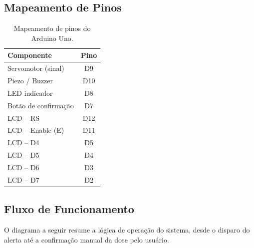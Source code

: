 \documentclass[11pt,a4paper]{article}
\begin{document}
\subsection{Mapeamento de Pinos}

\begin{table}[H]
\centering
\begin{tabularx}{0.8\linewidth}{@{}Y c@{}}
\toprule
\textbf{Componente} & \textbf{Pino} \\
\midrule
Servomotor (sinal) & D9 \\
Piezo / Buzzer & D10 \\
LED indicador & D8 \\
Botão de confirmação & D7 \\
LCD -- RS & D12 \\
LCD -- Enable (E) & D11 \\
LCD -- D4 & D5 \\
LCD -- D5 & D4 \\
LCD -- D6 & D3 \\
LCD -- D7 & D2 \\
\bottomrule
\end{tabularx}
\caption{Mapeamento de pinos do Arduino Uno.}
\end{table}

\subsection{Fluxo de Funcionamento}

O diagrama a seguir resume a lógica de operação do sistema, desde o disparo do alerta até a confirmação manual da dose pelo usuário.
\end{document}
